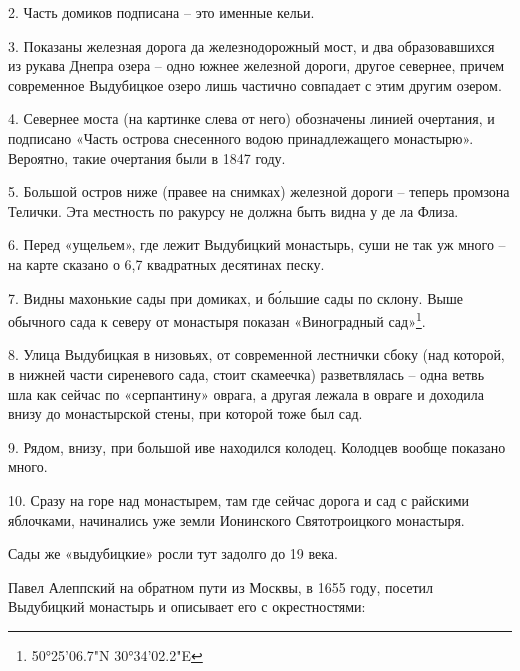 2. Часть домиков подписана – это именные кельи.


3. Показаны железная дорога да железнодорожный мост, и два образовавшихся из рукава Днепра озера – одно южнее железной дороги, другое севернее, причем современное Выдубицкое озеро лишь частично совпадает с этим другим озером.

4. Севернее моста (на картинке слева от него) обозначены линией очертания, и подписано «Часть острова снесенного водою принадлежащего монастырю». Вероятно, такие очертания были в 1847 году.

5. Большой остров ниже (правее на снимках) железной дороги – теперь промзона Телички. Эта местность по ракурсу не должна быть видна у де ла Флиза.

6. Перед «ущельем», где лежит Выдубицкий монастырь, суши не так уж много – на карте сказано о 6,7 квадратных десятинах песку.

7. Видны махонькие сады при домиках, и б\'ольшие сады по склону. Выше обычного сада к северу от монастыря показан «Виноградный сад»\footnote{50°25'06.7"N 30°34'02.2"E}.

8. Улица Выдубицкая в низовьях, от современной лестнички сбоку (над которой, в нижней части сиреневого сада, стоит скамеечка) разветвлялась – одна ветвь шла как сейчас по «серпантину» оврага, а другая лежала в овраге и доходила внизу до монастырской стены, при которой тоже был сад.

9. Рядом, внизу, при большой иве находился колодец. Колодцев вообще показано много.

10. Сразу на горе над монастырем, там где сейчас дорога и сад с райскими яблочками, начинались уже земли Ионинского Святотроицкого монастыря.

Сады же «выдубицкие» росли тут задолго до 19 века.

Павел Алеппский на обратном пути из Москвы, в 1655 году, посетил Выдубицкий монастырь и описывает его с окрестностями:

